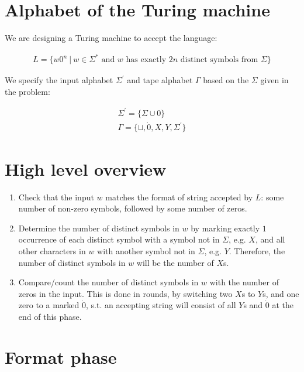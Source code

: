 \documentclass[11pt,addpoints,answers]{exam}
\newcommand{\1}{\mathbf{1}}
\begin{document}
\pagestyle{head}                %

\medskip
 
\section{Alphabet of the Turing machine}

\noindent We are designing a Turing machine to accept the language:

\begin{align*}
    L = \{w0^n \ |\  w \in \Sigma^* \text{ and } w \text{ has exactly } 2n \text{ distinct symbols from } \Sigma\}
\end{align*}

\noindent We specify the input alphabet $\Sigma^\prime$ and tape alphabet $\Gamma$ based on the $\Sigma$ given in the problem:

\begin{align*}
    \Sigma^\prime = \{\Sigma \cup 0\} \\
    \Gamma = \{\sqcup, \dot{0}, X, Y, \Sigma^\prime \}
\end{align*}

\section{High level overview}

\begin{enumerate}
\item Check that the input $w$ matches the format of string accepted by $L$: some number of non-zero symbols, followed by some number of zeros.

\item Determine the number of distinct symbols in $w$ by marking exactly $1$ occurrence of each distinct symbol with a symbol not in $\Sigma$, e.g. $X$, and all other characters in $w$ with another symbol not in $\Sigma$, e.g. $Y$. Therefore, the number of distinct symbols in $w$ will be the number of $X$s.

\item Compare/count the number of distinct symbols in $w$ with the number of zeros in the input. This is done in rounds, by switching two $X$s to $Y$s, and one zero to a marked $\dot{0}$, s.t. an accepting string will consist of all $Y$s and $\dot{0}$ at the end of this phase.

\end{enumerate}

\section{Format phase}
\end{document}
